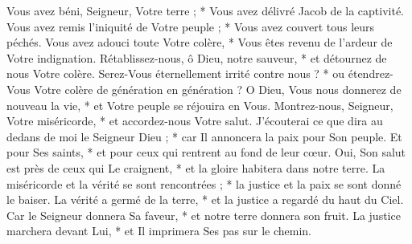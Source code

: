  Vous avez béni, Seigneur, Votre terre ; * Vous avez délivré Jacob de la captivité.
\versseparator
 Vous avez remis l'iniquité de Votre peuple ; * Vous avez couvert tous leurs péchés.
\versseparator
 Vous avez adouci toute Votre colère, * Vous êtes revenu de l'ardeur de Votre indignation.
\versseparator
 Rétablissez-nous, ô Dieu, notre sauveur, * et détournez de nous Votre colère.
\versseparator
 Serez-Vous éternellement irrité contre nous ? * ou étendrez-Vous Votre colère de génération en génération ?
\versseparator
 O Dieu, Vous nous donnerez de nouveau la vie, * et Votre peuple se réjouira en Vous.
\versseparator
 Montrez-nous, Seigneur, Votre miséricorde, * et accordez-nous Votre salut.
\versseparator
 J'écouterai ce que dira au dedans de moi le Seigneur Dieu ; * car Il annoncera la paix pour Son peuple. Et pour Ses saints, * et pour ceux qui rentrent au fond de leur cœur.
\versseparator
 Oui, Son salut est près de ceux qui Le craignent, * et la gloire habitera dans notre terre.
\versseparator
 La miséricorde et la vérité se sont rencontrées ; * la justice et la paix se sont donné le baiser.
\versseparator
 La vérité a germé de la terre, * et la justice a regardé du haut du Ciel.
\versseparator
 Car le Seigneur donnera Sa faveur, * et notre terre donnera son fruit.
\versseparator
 La justice marchera devant Lui, * et Il imprimera Ses pas sur le chemin.